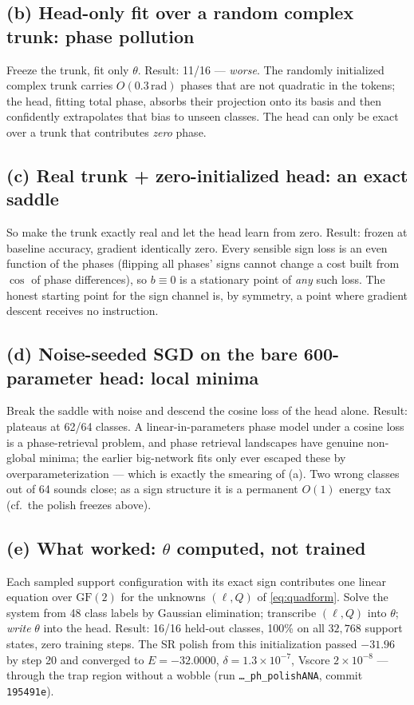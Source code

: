 \documentclass[11pt]{article}
\newcommand{\GF}{\mathrm{GF}(2)}
\begin{document}
\subsection{(b) Head-only fit over a random complex trunk: phase pollution}
Freeze the trunk, fit only $\theta$. Result: 11/16 --- \emph{worse}. The
randomly initialized complex trunk carries $O(0.3\,\mathrm{rad})$ phases that
are not quadratic in the tokens; the head, fitting total phase, absorbs their
projection onto its basis and then confidently extrapolates that bias to
unseen classes. The head can only be exact over a trunk that contributes
\emph{zero} phase.

\subsection{(c) Real trunk + zero-initialized head: an exact saddle}
So make the trunk exactly real and let the head learn from zero. Result:
frozen at baseline accuracy, gradient identically zero. Every sensible sign
loss is an even function of the phases (flipping all phases' signs cannot
change a cost built from $\cos$ of phase differences), so $b\equiv0$ is a
stationary point of \emph{any} such loss. The honest starting point for the
sign channel is, by symmetry, a point where gradient descent receives no
instruction.

\subsection{(d) Noise-seeded SGD on the bare 600-parameter head: local minima}
Break the saddle with noise and descend the cosine loss of the head alone.
Result: plateaus at 62/64 classes. A linear-in-parameters phase model under a
cosine loss is a phase-retrieval problem, and phase retrieval landscapes have
genuine non-global minima; the earlier big-network fits only ever escaped
these by overparameterization --- which is exactly the smearing of (a). Two
wrong classes out of 64 sounds close; as a sign structure it is a permanent
$O(1)$ energy tax (cf.\ the polish freezes above).

\subsection{(e) What worked: $\theta$ computed, not trained}
Each sampled support configuration with its exact sign contributes one linear
equation over $\GF$ for the unknowns $(\ell,Q)$ of \eqref{eq:quadform}. Solve
the system from 48 class labels by Gaussian elimination; transcribe
$(\ell,Q)$ into $\theta$; \emph{write} $\theta$ into the head. Result: 16/16
held-out classes, 100\% on all $32{,}768$ support states, zero training
steps. The SR polish from this initialization passed $-31.96$ by step 20 and
converged to $E=-32.0000$, $\delta=1.3\times10^{-7}$, Vscore $2\times10^{-8}$
--- through the trap region without a wobble (run
\texttt{\dots\_ph\_polishANA}, commit \texttt{195491e}).
\end{document}
